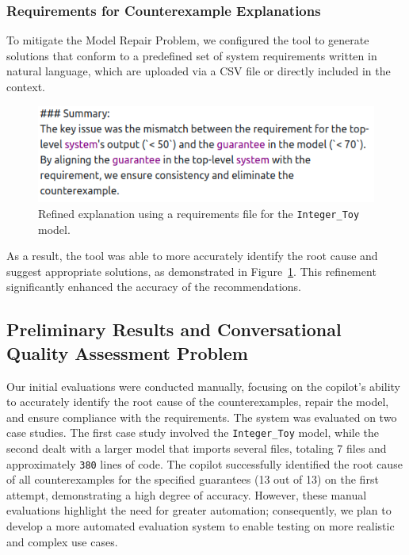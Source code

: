 \subsubsection{Requirements for Counterexample Explanations}

To mitigate the Model Repair Problem, we configured the tool to generate solutions that conform to a predefined set of system requirements written in natural language, which are uploaded via a CSV file or directly included in the context. 

\begin{figure}[t]  
    \centering
    \includegraphics[width=0.95\columnwidth]{REQ-AWARE-REF-high-res.png}  
    \caption{Refined explanation using a requirements file for the \texttt{Integer\_Toy} model.}
    \label{fig:REQ-AWARE-EXPL}
\end{figure}


As a result, the tool was able to more accurately identify the root cause and suggest appropriate solutions, as demonstrated in Figure~\ref{fig:REQ-AWARE-EXPL}.
%
%
This refinement significantly enhanced the accuracy of the recommendations.


\subsection{Preliminary Results and Conversational Quality Assessment Problem}
 
Our initial evaluations were conducted manually, focusing on the copilot's ability to accurately identify the root cause of the counterexamples, repair the model, and ensure compliance with the requirements. The system was evaluated on two case studies. The first case study involved the \texttt{Integer\_Toy} model, while the second dealt with a larger model that imports several files, totaling 7 files and approximately \texttt{380} lines of code. The copilot successfully identified the root cause of all counterexamples for the specified guarantees (13 out of 13) on the first attempt, demonstrating a high degree of accuracy.
%
However, these manual evaluations highlight the need for greater automation; consequently, we plan to develop a more automated evaluation system to enable testing on more realistic and complex use cases.
 

